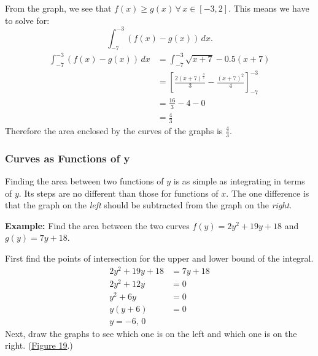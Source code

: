 \documentclass[12pt]{article}
\begin{document}
\begin{enumerate}
	      From the graph, we see that $f(x) \ge g(x) \, \forall \, x \in [-3, 2]$. This means we have to solve for:
	      \[ \int_{-7}^{-3} \left( f(x) - g(x) \right) \, dx. \]
	      \begin{align*}
		      \int_{-7}^{-3} \left( f(x) - g(x) \right) \, dx & = \int_{-7}^{-3} \sqrt{x+7} - 0.5(x+7)                                      \\[6pt]
		      & = \left[ \frac{2(x+7)^\frac{3}{2}}{3} - \frac{(x+7)^2}{4} \right]_{-7}^{-3} \\[6pt]
		      & = \frac{16}{3} - 4 - 0                                                      \\[6pt]
		      & = \frac{4}{3}
	      \end{align*}
	      Therefore the area enclosed by the curves of the graphs is $\frac{4}{3}$.
\end{enumerate}

\subsubsection{Curves as Functions of y}
Finding the area between two functions of $y$ is as simple as integrating in terms of $y$. Its steps are no different than those for functions of $x$. The one difference is that the graph on the \textit{left} should be subtracted from the graph on the \textit{right}.

\noindent \textbf{Example:} Find the area between the two curves $f(y)=2y^2 + 19y + 18$ and $g(y)=7y + 18$.

\noindent First find the points of intersection for the upper and lower bound of the integral.
\begin{align*}
	2y^2 + 19y + 18 & = 7y + 18 \\
	2y^2 + 12y      & = 0       \\
	y^2 + 6y        & = 0       \\
	y(y+6)          & = 0       \\
	y = -6, \, 0
\end{align*}
Next, draw the graphs to see which one is on the left and which one is on the right. (\hyperref[fig:abcy1]{Figure 19}.)
\end{document}
